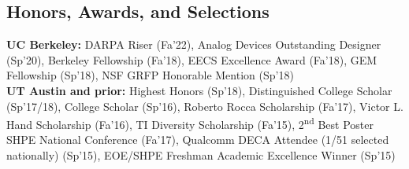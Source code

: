 \documentclass[line]{res}
\begin{document}
\begin{resume}

\section{\Large{Honors, Awards, and Selections}}
\label{sec:honors}
\vspace{2mm}

\textbf{UC Berkeley:} DARPA Riser (Fa'22), Analog Devices Outstanding Designer (Sp'20), Berkeley Fellowship (Fa'18), EECS Excellence Award (Fa'18), GEM Fellowship (Sp'18), NSF GRFP Honorable Mention (Sp'18) \\
\textbf{UT Austin and prior:} Highest Honors (Sp'18),
Distinguished College Scholar (Sp'17/18),
College Scholar (Sp'16),
Roberto Rocca Scholarship (Fa'17),
Victor L. Hand Scholarship (Fa'16),
TI Diversity Scholarship (Fa'15),
2\textsuperscript{nd} Best Poster SHPE National Conference (Fa'17),
Qualcomm DECA Attendee (1/51 selected nationally) (Sp'15),
EOE/SHPE Freshman Academic Excellence Winner (Sp'15)

\end{resume}
\end{document}
